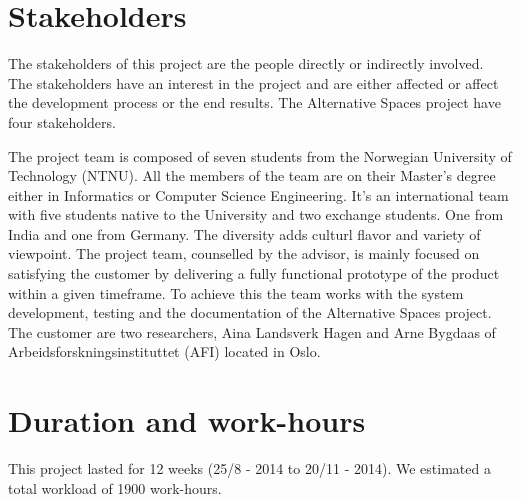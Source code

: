 \section{Stakeholders}

The stakeholders of this project are the people directly or indirectly involved. The stakeholders have an interest in the project and are either affected or affect the development process or the end results. The Alternative Spaces project have four stakeholders. 

The project team is composed of seven students from the Norwegian University of Technology (NTNU). All the members of the team are on their Master's degree either in Informatics or Computer Science Engineering. It's an international team with five students native to the University and two exchange students. One from India and one from Germany. The diversity adds culturl flavor and variety of viewpoint. The project team, counselled by the advisor, is mainly focused on satisfying the customer by delivering a fully functional prototype of the product within a given timeframe. To achieve this the team works with the system development, testing and the documentation of the Alternative Spaces project. 
The customer are two researchers, Aina Landsverk Hagen and Arne Bygdaas of Arbeidsforskningsinstituttet (AFI) located in Oslo. 

\section{Duration and work-hours} This project lasted for 12 weeks (25/8 - 2014 to 20/11 - 2014). We estimated a total workload of 1900 work-hours.